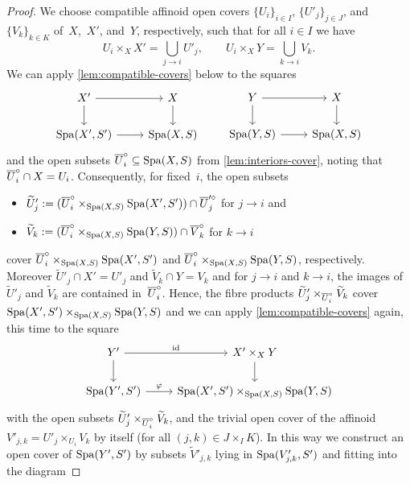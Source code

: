 \begin{proof}
    We choose compatible affinoid open covers $\{U_i\}_{i \in I}$, $\{U'_j\}_{j \in J}$, and $\{V_k\}_{k \in K}$ of~$X$,~$X'$, and~$Y$, respectively, such that for all $i \in I$ we have
    \[
        U_i \times_X X' = \bigcup_{j \to i} U'_j, \qquad U_i \times_X Y = \bigcup_{k \to i} V_k.
    \]
    We can apply \cref{lem:compatible-covers} below to the squares
    \[
        \begin{tikzcd}
            X' \ar[r] \ar[d] & X \ar[d] \\
            \Spa(X',S')  \ar[r] & \Spa(X,S)
        \end{tikzcd} \qquad
             \begin{tikzcd}
            Y \ar[r] \ar[d] & X \ar[d] \\
            \Spa(Y,S)  \ar[r] & \Spa(X,S)
        \end{tikzcd}
    \]
    and the open subsets $\overline{U}_i^\circ \subseteq \operatorname{Spa}(X,S)$ from \cref{lem:interiors-cover}, noting that $\overline{U}_i^\circ \cap X = U_i$.
    Consequently, for fixed~$i$, the open subsets 
    \begin{itemize}
        \item 
        $\widetilde{U}'_j := (\overline{U}^\circ_i \times_{\operatorname{Spa}(X,S)} \operatorname{Spa}(X',S')) \cap \overline{U}'^\circ_j$ for $j \to i$ and
        \item 
        $\widetilde{V}_k := (\overline{U}^\circ_i \times_{\operatorname{Spa}(X,S)} \operatorname{Spa}(Y,S)) \cap \overline{V}_k^\circ$ for $k \to i$
    \end{itemize}  
    cover $\overline{U}^\circ_i \times_{\operatorname{Spa}(X,S)} \operatorname{Spa}(X',S')$ and $\overline{U}^\circ_i \times_{\operatorname{Spa}(X,S)} \operatorname{Spa}(Y,S)$, respectively.
    Moreover $\widetilde{U}'_j \cap X' = U'_j$ and $\widetilde{V}_k \cap Y = V_k$ and for $j \to i$ and $k \to i$, the images of~$\widetilde{U}'_j$ and $\widetilde{V}_k$ are contained in~$\overline{U}^\circ_i$.
    Hence, the fibre products $\widetilde{U}'_j \times_{\overline{U}^\circ_i} \widetilde{V}_k$ cover $\operatorname{Spa}(X',S') \times_{\operatorname{Spa}(X,S)} \operatorname{Spa}(Y,S)$ and we can apply \cref{lem:compatible-covers} again, this time to the square
    \[
        \begin{tikzcd}
            Y' \ar[r,"\id"] \ar[d] & X' \times_X Y \ar[d] \\
            \Spa(Y',S') \ar[r,"\varphi"] & \Spa(X',S') \times_{\Spa(X,S)} \Spa(Y,S)
        \end{tikzcd}
    \]
    with the open subsets $\widetilde{U}'_j \times_{\overline{U}^\circ_i} \widetilde{V}_k$, and the trivial open cover of the affinoid $V'_{j,k} = U'_j \times_{U_i} V_k$ by itself (for all $(j,k) \in J \times_I K$).
    In this way we construct an open cover of $\operatorname{Spa}(Y',S')$ by subsets $\widetilde{V}'_{j,k}$  lying in $\operatorname{Spa}(V'_{j,k},S')$ and fitting into the diagram

\end{proof}
